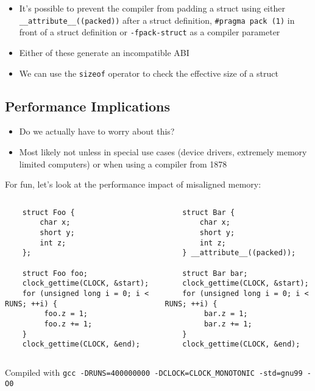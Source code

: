 \documentclass{beamer}
\begin{document}
\begin{frame}[fragile]{\insertsection}{\insertsubsection}
    \begin{itemize}
        \item It's possible to prevent the compiler from padding a struct using either
            \verb|__attribute__((packed))| after a struct definition, \verb|#pragma pack (1)| in
            front of a struct definition or \verb|-fpack-struct| as a compiler parameter\pause
        \item Either of these generate an incompatible ABI
        \item We can use the \verb|sizeof| operator to check the effective size of a struct
    \end{itemize}
\end{frame}

\subsection{Performance Implications}
\begin{frame}{\insertsection}{\insertsubsection}
	\begin{itemize}
        \item Do we actually have to worry about this?\pause
        \item Most likely not unless in special use cases (device drivers, extremely memory
            limited computers) or when using a compiler from 1878
	\end{itemize}
\end{frame}

\begin{frame}[fragile]{\insertsection}{\insertsubsection}
    For fun, let's look at the performance impact of misaligned memory:
    \begin{columns}[]
            \begin{verbatim}
    struct Foo {
        char x;
        short y;
        int z;
    };

    struct Foo foo;
    clock_gettime(CLOCK, &start);
    for (unsigned long i = 0; i < RUNS; ++i) {
         foo.z = 1;
         foo.z += 1;
    }
    clock_gettime(CLOCK, &end);
            \end{verbatim}

            \begin{verbatim}
    struct Bar {
        char x;
        short y;
        int z;
    } __attribute__((packed));

    struct Bar bar;
    clock_gettime(CLOCK, &start);
    for (unsigned long i = 0; i < RUNS; ++i) {
         bar.z = 1;
         bar.z += 1;
    }
    clock_gettime(CLOCK, &end);
            \end{verbatim}
    \end{columns}
    \begin{block}{Compiled with}
        \small \verb|gcc -DRUNS=400000000 -DCLOCK=CLOCK_MONOTONIC -std=gnu99 -O0|
    \end{block}
\end{frame}
\end{document}
